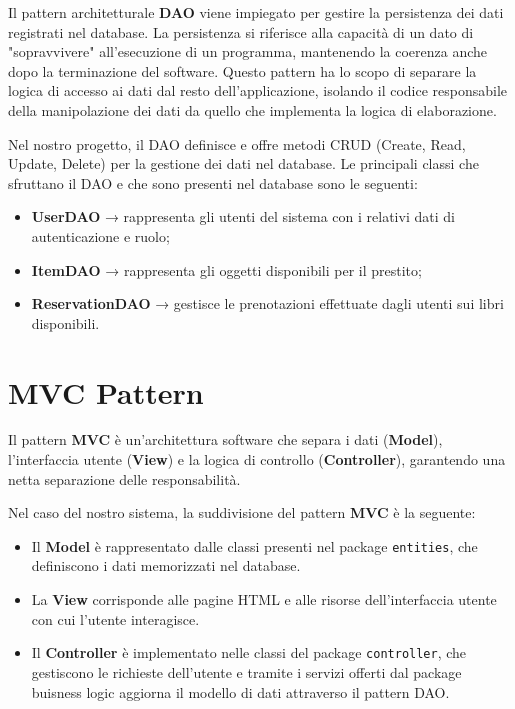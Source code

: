 \documentclass[twoside,openright,titlepage,fleqn,headinclude,12pt,a4paper,BCOR=5mm,footinclude]{scrbook}
\begin{document}
Il pattern architetturale \textbf{DAO} viene impiegato per gestire la persistenza dei dati registrati nel database. La persistenza si riferisce alla capacità di un dato di "sopravvivere" all'esecuzione di un programma, mantenendo la coerenza anche dopo la terminazione del software. Questo pattern ha lo scopo di separare la logica di accesso ai dati dal resto dell’applicazione, isolando il codice responsabile della manipolazione dei dati da quello che implementa la logica di elaborazione.

Nel nostro progetto, il DAO definisce e offre metodi CRUD (Create, Read, Update, Delete) per la gestione dei dati nel database. Le principali classi che sfruttano il DAO e che sono presenti nel database sono le seguenti:

\begin{itemize}
    \item \textbf{UserDAO} → rappresenta gli utenti del sistema con i relativi dati di autenticazione e ruolo;
    \item \textbf{ItemDAO} → rappresenta gli oggetti disponibili per il prestito;
    \item \textbf{ReservationDAO} → gestisce le prenotazioni effettuate dagli utenti sui libri disponibili.
\end{itemize}


\section{MVC Pattern}
 Il pattern \textbf{MVC} è un'architettura software che separa i dati (\textbf{Model}), l’interfaccia utente (\textbf{View}) e la logica di controllo (\textbf{Controller}), garantendo una netta separazione delle responsabilità. 

Nel caso del nostro sistema, la suddivisione del pattern \textbf{MVC} è la seguente:
\begin{itemize}
    \item Il \textbf{Model} è rappresentato dalle classi presenti nel package \texttt{entities}, che definiscono i dati memorizzati nel database.
    \item La \textbf{View} corrisponde alle pagine HTML e alle risorse dell’interfaccia utente con cui l’utente interagisce.
    \item Il \textbf{Controller} è implementato nelle classi del package \texttt{controller}, che gestiscono le richieste dell'utente e tramite i servizi offerti dal package buisness logic aggiorna il modello di dati attraverso il pattern DAO.
\end{itemize}
\end{document}
